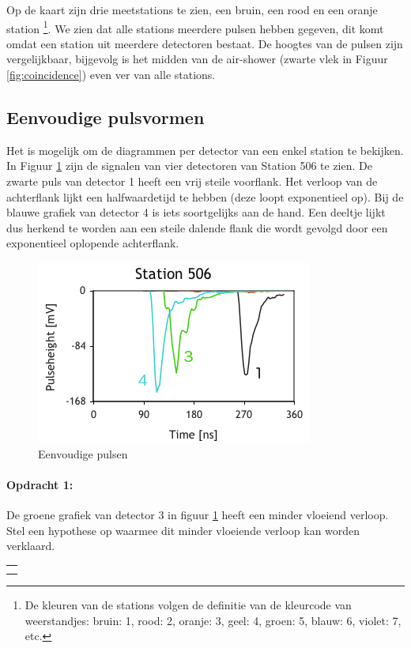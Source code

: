 Op de kaart zijn drie meetstations te zien, een bruin, een rood en
een oranje station%
\footnote{De kleuren van de stations volgen de definitie van de kleurcode van
weerstandjes: bruin: 1, rood: 2, oranje: 3, geel: 4, groen: 5, blauw:
6, violet: 7, etc. %
}. We zien dat alle stations meerdere pulsen hebben gegeven, dit komt
omdat een station uit meerdere detectoren bestaat. De hoogtes van de
pulsen zijn vergelijkbaar, bijgevolg is het midden van de air-shower
(zwarte vlek in Figuur \ref{fig:coincidence}) even ver van alle stations. 


\subsection{Eenvoudige pulsvormen}

Het is mogelijk om de diagrammen per detector van een enkel station
te bekijken. In Figuur \ref{fig:Eenvoudige-pulsen} zijn de signalen
van vier detectoren van Station 506 te zien. De zwarte puls van detector
1 heeft een vrij steile voorflank. Het verloop van de achterflank
lijkt een halfwaardetijd te hebben (deze loopt exponentieel op). Bij
de blauwe grafiek van detector 4 is iets soortgelijks aan de hand.
Een deeltje lijkt dus herkend te worden aan een steile dalende flank
die wordt gevolgd door een exponentieel oplopende achterflank.

\begin{figure}[h]
\noindent \begin{centering}
\includegraphics[scale=0.65]{Figures/Traces506}
\par\end{centering}

\caption{\label{fig:Eenvoudige-pulsen}Eenvoudige pulsen}
\end{figure}


\begin{minipage}[t]{1\columnwidth}%

\paragraph{Opdracht 1:}

De groene grafiek van detector 3 in figuur \ref{fig:Eenvoudige-pulsen}
heeft een minder vloeiend verloop. Stel een hypothese op waarmee dit
minder vloeiende verloop kan worden verklaard.

\begin{tabular}{>{\raggedright}p{16.6cm}}
\tabularnewline
\hline 
\tabularnewline
\hline 
\tabularnewline
\hline 
\tabularnewline
\hline 
\end{tabular}%
\end{minipage}

